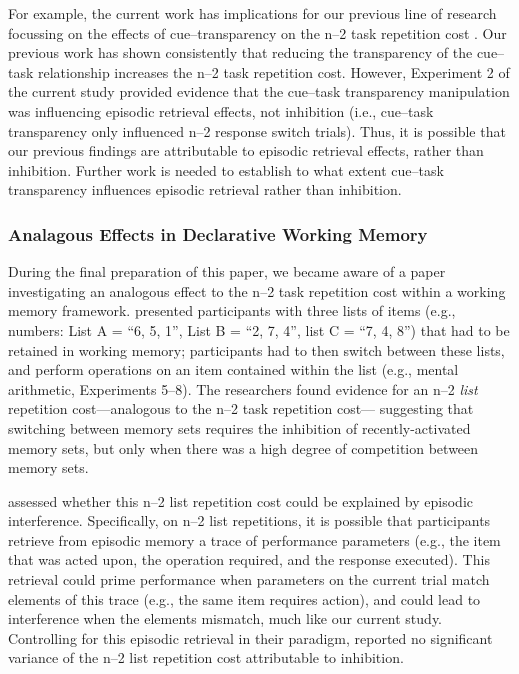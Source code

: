 \documentclass[a4paper, doc, natbib]{apa6}
\begin{document}
For example, the current work has implications for our previous line of research focussing on the effects of cue--transparency on the n--2 task repetition cost \citep{Grange2009, Grange2010, Grange2015a, Houghton2009}. Our previous work has shown consistently that reducing the transparency of the cue--task relationship increases the n--2 task repetition cost. However, Experiment 2 of the current study provided evidence that the cue--task transparency manipulation was influencing episodic retrieval effects, not inhibition (i.e., cue--task transparency only influenced n--2 response switch trials). Thus, it is possible that our previous findings are attributable to episodic retrieval effects, rather than inhibition. Further work is needed to establish to what extent cue--task transparency influences episodic retrieval rather than inhibition. 

\subsubsection{Analagous Effects in Declarative Working Memory}
During the final preparation of this paper, we became aware of a paper investigating an analogous effect to the n--2 task repetition cost within a working memory framework. \cite{Gadeinpress} presented participants with three lists of items (e.g., numbers: List A = ``6, 5, 1'', List B = ``2, 7, 4'', list C = ``7, 4, 8'') that had to be retained in working memory; participants had to then switch between these lists, and perform operations on an item contained within the list (e.g., mental arithmetic, Experiments 5--8). The researchers found evidence for an n--2 \emph{list} repetition cost---analogous to the n--2 task repetition cost--- suggesting that switching between memory sets requires the inhibition of recently-activated memory sets, but only when there was a high degree of competition between memory sets.

\cite{Gadeinpress} assessed whether this n--2 list repetition cost could be explained by episodic interference. Specifically, on n--2 list repetitions, it is possible that participants retrieve from episodic memory a trace of performance parameters (e.g., the item that was acted upon, the operation required, and the response executed). This retrieval could prime performance when parameters on the current trial match elements of this trace (e.g., the same item requires action), and could lead to interference when the elements mismatch, much like our current study. Controlling for this episodic retrieval in their paradigm, \cite{Gadeinpress} reported no significant variance of the n--2 list repetition cost attributable to inhibition. 
\end{document}

